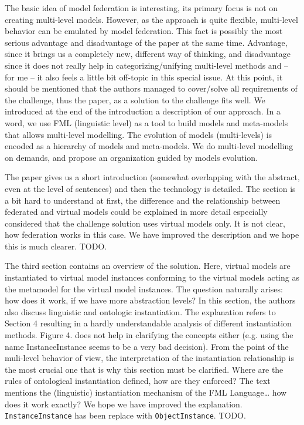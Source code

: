 \documentclass[10pt]{article}
\begin{document}
\pagebreak


\begin{response}{The basic idea of model federation is interesting, its primary focus is not on creating multi-level models. However, as the approach is quite flexible, multi-level behavior can be emulated by model federation. This fact is possibly the most serious advantage and disadvantage of the paper at the same time. Advantage, since it brings us a completely new, different way of thinking, and disadvantage since it does not really help in categorizing/unifying multi-level methods and – for me – it also feels a little bit off-topic in this special issue. At this point, it should be mentioned that the authors managed to cover/solve all requirements of the challenge, thus the paper, as a solution to the challenge fits well.} We introduced at the end of the introduction a description of our approach. In a word, we use FML (linguistic level) as a tool to build models and meta-models that allows multi-level modelling. The evolution of models (multi-levels) is encoded as a hierarchy of models and meta-models. We do multi-level modelling on demands, and propose an organization guided by models evolution. 
\end{response}

\begin{response}{The paper gives us a short introduction (somewhat overlapping with the abstract, even at the level of sentences) and then the technology is detailed. The section is a bit hard to understand at first, the difference and the relationship between federated and virtual models could be explained in more detail especially considered that the challenge solution uses virtual models only. It is not clear, how federation works in this case.} 
We have improved the description and we hope this is much clearer. TODO.
\end{response}

\begin{response}{The third section contains an overview of the solution. Here, virtual models are instantiated to virtual model instances conforming to the virtual models acting as the metamodel for the virtual model instances. The question naturally arises: how does it work, if we have more abstraction levels?  In this section, the authors also discuss linguistic and ontologic instantiation. The explanation refers to Section 4 resulting in a hardly understandable analysis of different instantiation methods. Figure 4. does not help in clarifying the concepts either (e.g. using the name InstanceInstance seems to be a very bad decision). From the point of the muli-level behavior of view, the interpretation of the instantiation relationship is the most crucial one that is why this section must be clarified. Where are the rules of ontological instantiation defined, how are they enforced? The text mentions the (linguistic) instantiation mechanism of the FML Language… how does it work exactly?} 
We hope we have improved the explanation. \texttt{InstanceInstance} has been replace with \texttt{ObjectInstance}. TODO.
\end{response}
\end{document}
